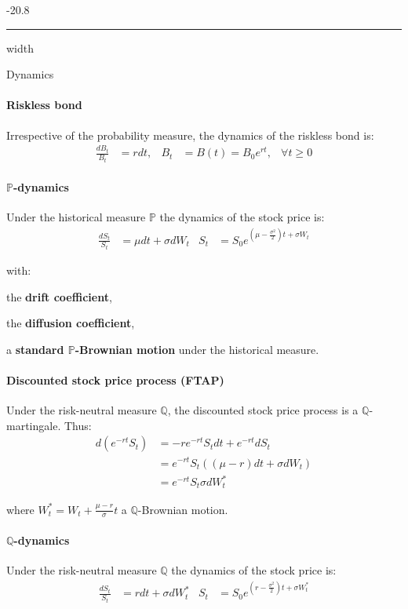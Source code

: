 \documentclass[a4paper,landscape,7pt,fleqn]{scrartcl}
\makeatletter
\renewcommand{\emph}[1]{\textbf{#1}}
\renewcommand{\subsubsection}{\@startsection{subsubsection}{1}{0mm}%
{-2\baselineskip}{0.8\baselineskip}%
{\hrule depth 0.2pt width\columnwidth\vspace*{1.2em}\normalsize\bfseries}}
\makeatother
\begin{document}
\begin{multicols*}{3}
\subsubsection{Dynamics}

\paragraph{Riskless bond}
Irrespective of the probability measure, the dynamics of the riskless bond is:
\begin{align*}
\frac{dB_t}{B_t} &= r dt, & B_t &= B(t) = B_0 e^{r t}, &\forall t \geq 0
\end{align*}

\paragraph{$\mathbb{P}$-dynamics}
Under the historical measure $\mathbb{P}$ the dynamics of the stock price is:
\begin{align*}
\frac{dS_t}{S_t} &= \mu dt + \sigma dW_t & S_t &= S_0 e^{\left( \mu - \frac{\sigma^2}{2} \right) t + \sigma W_t}
\end{align*}

with:
\begin{description}[style=multiline,leftmargin=0.5cm]
\item[$\mu$] the \emph{drift coefficient},
\item[$\sigma$] the \emph{diffusion coefficient},
\item[$W_t$] a \emph{standard $\mathbb{P}$-Brownian motion} under the historical measure.
\end{description}

\paragraph{Discounted stock price process (FTAP)}
Under the risk-neutral measure $\mathbb{Q}$, the discounted stock price process is a $\mathbb{Q}$-martingale. Thus:
\begin{align*}
d \left( e^{-rt} S_t \right) &= -r e^{-rt} S_t dt + e^{-rt} dS_t \\
&= e^{-rt} S_t \left( (\mu-r) dt + \sigma dW_t \right) \\
&= e^{-rt} S_t \sigma dW_t^\ast
\end{align*}

where $W_t^\ast = W_t + \frac{\mu-r}{\sigma} t$ a $\mathbb{Q}$-Brownian motion.

\paragraph{$\mathbb{Q}$-dynamics}
Under the risk-neutral measure $\mathbb{Q}$ the dynamics of the stock price is:
\begin{align*}
\frac{dS_t}{S_t} &= r dt + \sigma dW_t^\ast & S_t &= S_0 e^{\left( r - \frac{\sigma^2}{2} \right) t + \sigma W_t^\ast}
\end{align*}


\end{multicols*}
\end{document}
